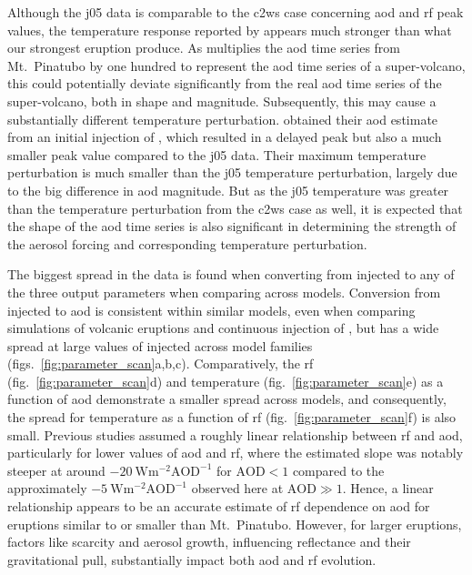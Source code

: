 \documentclass{ametsocV6.1}
\newcommand{\iso}[1][i]{{#1}njected \ce{SO2}}
\begin{document}
Although the \gls{j05} data is comparable to the \gls{c2ws} case concerning \gls{aod}
and \gls{rf} peak values, the temperature response reported by \citet{jones2005} appears
much stronger than what our strongest eruption produce. As \citet{jones2005} multiplies
the \gls{aod} time series from Mt.\ Pinatubo by one hundred to represent the \gls{aod}
time series of a super-volcano, this could potentially deviate significantly from the
real \gls{aod} time series of the super-volcano, both in shape and magnitude.
Subsequently, this may cause a substantially different temperature perturbation.
\citet{timmreck2010} obtained their \gls{aod} estimate from an initial injection of
, which resulted in a delayed peak but also a much smaller peak value compared
to the \gls{j05} data. Their maximum temperature perturbation is much smaller than the
\gls{j05} temperature perturbation, largely due to the big difference in \gls{aod}
magnitude. But as the \gls{j05} temperature was greater than the temperature
perturbation from the \gls{c2ws} case as well, it is expected that the shape of the
\gls{aod} time series is also significant in determining the strength of the aerosol
forcing and corresponding temperature perturbation.

The biggest spread in the data is found when converting from \iso{} to any of the three
output parameters when comparing across models. Conversion from \iso{} to \gls{aod} is
consistent within similar models, even when comparing simulations of volcanic eruptions
\citep{timmreck2010} and continuous injection of  \citep{niemeier2015}, but has
a wide spread at large values of \iso{} across model families
(figs.~\ref{fig:parameter_scan}a,b,c). Comparatively, the \gls{rf}
(fig.~\ref{fig:parameter_scan}d) and temperature (fig.~\ref{fig:parameter_scan}e) as a
function of \gls{aod} demonstrate a smaller spread across models, and consequently, the
spread for temperature as a function of \gls{rf} (fig.~\ref{fig:parameter_scan}f) is
also small. Previous studies assumed a roughly linear relationship between \gls{rf} and
\gls{aod}, particularly for lower values of \gls{aod} and \gls{rf}, where the estimated
slope was notably steeper at around \(\SI{-20}{\watt\metre^{-2}\mathrm{AOD}^{-1}}\) for
\(\mathrm{AOD}<1\) compared to the approximately
\(\SI{-5}{\watt\metre^{-2}\mathrm{AOD}^{-1}}\) observed here at \(\mathrm{AOD}\gg1\).
Hence, a linear relationship appears to be an accurate estimate of \gls{rf} dependence
on \gls{aod} for eruptions similar to or smaller than Mt.\ Pinatubo. However, for larger
eruptions, factors like  scarcity and aerosol growth, influencing reflectance and
their gravitational pull, substantially impact both \gls{aod} and \gls{rf} evolution.
\end{document}

